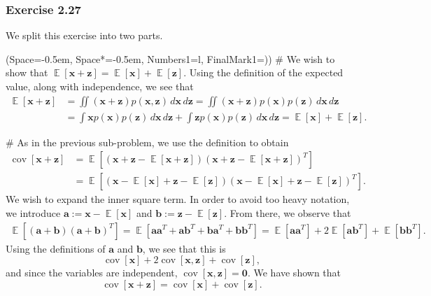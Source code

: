 \documentclass[12pt, a4paper]{article}
\newcommand{\listSpace}{-0.5em}%
\newcommand{\vect}[1]{\bm{#1}}
\DeclareMathOperator{\E}{\mathbb{E}}
\DeclareMathOperator{\cov}{\operatorname{cov}}
\begin{document}
\subsubsection*{Exercise 2.27}
We split this exercise into two parts.
\begin{easylist}[enumerate]
	\ListProperties(Space=\listSpace, Space*=\listSpace, Numbers1=l, FinalMark1={)})
	# We wish to show that $\E[\vect{x} + \vect{z}] = \E[\vect{x}] + \E[ \vect{z}]$.
	 Using the definition of the expected value, along with independence, we see that
	\begin{align*}
		\E[\vect{x} + \vect{z}] &= \iint (\vect{x} + \vect{z}) p(\vect{x}, \vect{z}) \, d\vect{x} \, d\vect{z} 
		= \iint (\vect{x} + \vect{z}) p(\vect{x}) p(\vect{z}) \, d\vect{x} \, d\vect{z}\\
		&= \int \vect{x} p(\vect{x}) p(\vect{z}) \, d\vect{x} \, d\vect{z} + \int \vect{z} p(\vect{x}) p(\vect{z}) \, d\vect{x} \, d\vect{z}
		= \E[\vect{x}] + \E[ \vect{z}].
	\end{align*}
	
	# As in the previous sub-problem, we use the definition to obtain
	\begin{align*}
	\cov[\vect{x} + \vect{z}] &= \E \left[ (\vect{x} + \vect{z} - \E[\vect{x} + \vect{z}]) (\vect{x} + \vect{z} - \E[\vect{x} + \vect{z}])^T \right] \\
	&= \E \left[ (\vect{x} - \E[\vect{x}] + \vect{z} - \E[\vect{z}]) (\vect{x} - \E[\vect{x}] + \vect{z} - \E[\vect{z}])^T \right].
	\end{align*}
	We wish to expand the inner square term.
	In order to avoid too heavy notation, we introduce $\vect{a}:= \vect{x} - \E[\vect{x}]$ and $\vect{b} := \vect{z} - \E[\vect{z}]$.
	From there, we observe that
	\begin{align*}
	\E \left[ (\vect{a} + \vect{b}) (\vect{a} + \vect{b})^T \right] = \E \left[ \vect{a}\vect{a}^T + \vect{a}\vect{b}^T + \vect{b}\vect{a}^T + \vect{b}\vect{b}^T \right]
	=
	\E \left[ \vect{a}\vect{a}^T  \right] +
	2 \E \left[ \vect{a}\vect{b}^T  \right] +
	\E \left[  \vect{b}\vect{b}^T \right].
	\end{align*}
	Using the definitions of $\vect{a}$ and $\vect{b}$, we see that this is
	\begin{equation*}
		\cov[\vect{x}] + 2 \cov[\vect{x}, \vect{z}] + \cov[\vect{z}],
	\end{equation*}
	and since the variables are independent,  $\cov[\vect{x}, \vect{z}] = \vect{0}.$
	We have shown that 
	\begin{equation*}
		\cov[\vect{x} + \vect{z}] = \cov[\vect{x}] + \cov[\vect{z}].
	\end{equation*}
\end{easylist}
\end{document}
